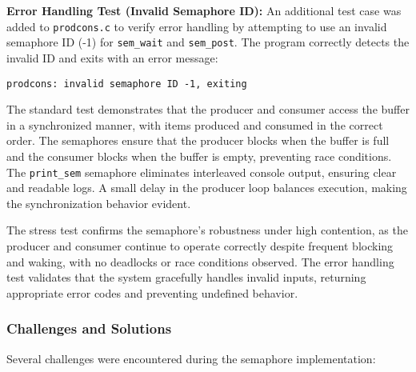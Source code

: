\documentclass[12pt]{article}
\begin{document}
\textbf{Error Handling Test (Invalid Semaphore ID):} An additional test case was added to \texttt{prodcons.c} to verify error handling by attempting to use an invalid semaphore ID (-1) for \texttt{sem\_wait} and \texttt{sem\_post}. The program correctly detects the invalid ID and exits with an error message:
\begin{lstlisting}
prodcons: invalid semaphore ID -1, exiting
\end{lstlisting}

The standard test demonstrates that the producer and consumer access the buffer in a synchronized manner, with items produced and consumed in the correct order. The semaphores ensure that the producer blocks when the buffer is full and the consumer blocks when the buffer is empty, preventing race conditions. The \texttt{print\_sem} semaphore eliminates interleaved console output, ensuring clear and readable logs. A small delay in the producer loop balances execution, making the synchronization behavior evident.

The stress test confirms the semaphore’s robustness under high contention, as the producer and consumer continue to operate correctly despite frequent blocking and waking, with no deadlocks or race conditions observed. The error handling test validates that the system gracefully handles invalid inputs, returning appropriate error codes and preventing undefined behavior.

\subsubsection{Challenges and Solutions}
\label{subsubsec:semaphore-challenges}

Several challenges were encountered during the semaphore implementation:
\end{document}
